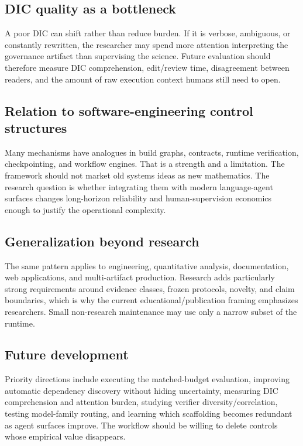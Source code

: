 \documentclass[11pt,a4paper]{article}
\begin{document}
\subsection{DIC quality as a bottleneck}
A poor DIC can shift rather than reduce burden. If it is verbose, ambiguous, or constantly rewritten, the researcher may spend more attention interpreting the governance artifact than supervising the science. Future evaluation should therefore measure DIC comprehension, edit/review time, disagreement between readers, and the amount of raw execution context humans still need to open.

\subsection{Relation to software-engineering control structures}
Many mechanisms have analogues in build graphs, contracts, runtime verification, checkpointing, and workflow engines. That is a strength and a limitation. The framework should not market old systems ideas as new mathematics. The research question is whether integrating them with modern language-agent surfaces changes long-horizon reliability and human-supervision economics enough to justify the operational complexity.

\subsection{Generalization beyond research}
The same pattern applies to engineering, quantitative analysis, documentation, web applications, and multi-artifact production. Research adds particularly strong requirements around evidence classes, frozen protocols, novelty, and claim boundaries, which is why the current educational/publication framing emphasizes researchers. Small non-research maintenance may use only a narrow subset of the runtime.

\subsection{Future development}
Priority directions include executing the matched-budget evaluation, improving automatic dependency discovery without hiding uncertainty, measuring DIC comprehension and attention burden, studying verifier diversity/correlation, testing model-family routing, and learning which scaffolding becomes redundant as agent surfaces improve. The workflow should be willing to delete controls whose empirical value disappears.
\end{document}

